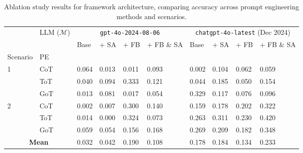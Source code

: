 \begin{table*}[!t]
\caption{Ablation study results for framework architecture, comparing accuracy across prompt engineering methods and scenarios.}
\label{tab:result_pe}
\begin{tabular}{p{1.5cm}p{1.5cm}|p{1.3cm}p{1.3cm}p{1.3cm}p{1.3cm}|p{1.3cm}p{1.3cm}p{1.3cm}p{1.3cm}}
\toprule
 & LLM ($\mathcal{M}$) & \multicolumn{4}{c|}{\texttt{gpt-4o-2024-08-06}} & \multicolumn{4}{c}{\texttt{chatgpt-4o-latest} (Dec 2024)} \\
 &  & Base & + SA & + FB & + FB \& SA & Base & + SA & + FB & + FB \& SA \\
Scenario & PE &  &  &  &  &  &  &  &  \\
\midrule
\multirow[t]{3}{*}{1} & CoT & 0.064 & 0.013 & 0.011 & 0.093 & 0.002 & 0.104 & 0.062 & 0.059 \\
 & ToT & 0.040 & 0.094 & 0.333 & 0.121 & 0.044 & 0.185 & 0.050 & 0.154 \\
 & GoT & 0.013 & 0.081 & 0.017 & 0.054 & 0.329 & 0.117 & 0.076 & 0.096 \\
\midrule
\multirow[t]{3}{*}{2} & CoT & 0.002 & 0.007 & 0.300 & 0.140 & 0.159 & 0.178 & 0.202 & 0.322 \\
 & ToT & 0.014 & 0.000 & 0.324 & 0.073 & 0.263 & 0.311 & 0.230 & 0.420 \\
 & GoT & 0.059 & 0.054 & 0.156 & 0.168 & 0.269 & 0.209 & 0.182 & 0.348 \\
\midrule
\multicolumn{2}{c|}{\textbf{Mean}} & 0.032 & 0.042 & 0.190 & 0.108 & 0.178 & 0.184 & 0.134 & 0.233 \\
\bottomrule
\end{tabular}
\end{table*}